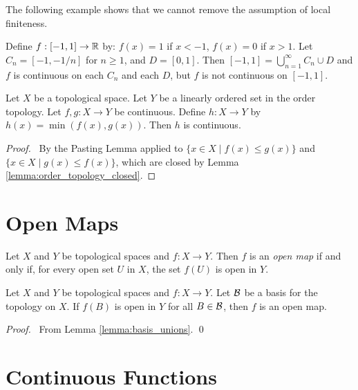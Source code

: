 The following example shows that we cannot remove the assumption of local finiteness.

\begin{example}
    Define $f : [-1,1] \rightarrow \mathbb{R}$ by: $f(x) = 1$ if $x < -1$, $f(x) = 0$ if $x > 1$. Let $C_n = [-1,-1/n]$ for $n \geq 1$, and $D = [0,1]$. Then
    $[-1,1] = \bigcup_{n=1}^\infty C_n \cup D$ and $f$ is continuous on each $C_n$ and each $D$, but $f$ is not continuous on $[-1,1]$.    
\end{example}

\begin{proposition}
    Let $X$ be a topological space.
    Let $Y$ be a linearly ordered set in the order topology. Let $f, g : X \rightarrow Y$ be continuous. Define $h : X \rightarrow Y$ by $h(x) = \min(f(x),g(x))$.
    Then $h$ is continuous.
\end{proposition}

\begin{proof}
    \pf\ By the Pasting Lemma applied to $\{ x \in X \mid f(x) \leq g(x) \}$ and $\{ x \in X \mid g(x) \leq f(x) \}$, which are closed by Lemma \ref{lemma:order_topology_closed}.
\end{proof}

\section{Open Maps}

\begin{definition}
    Let $X$ and $Y$ be topological spaces and $f : X \rightarrow Y$. Then $f$ is an \emph{open map} if and
    only if, for every open set $U$ in $X$, the set $f(U)$ is open in $Y$.
\end{definition}

\begin{lemma}
    \label{lemma:open_map_basis}
    Let $X$ and $Y$ be topological spaces and $f : X \rightarrow Y$. Let $\mathcal{B}$ be a basis for the topology on $X$.
    If $f(B)$ is open in $Y$ for all $B \in \mathcal{B}$, then $f$ is an open map.
\end{lemma}

\begin{proof}
    \pf\ From Lemma \ref{lemma:basis_unions}. \qed
\end{proof}

\section{Continuous Functions}

